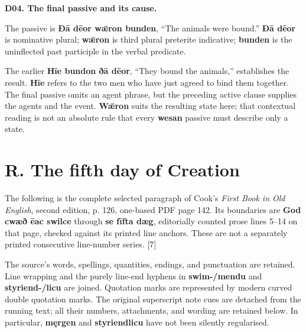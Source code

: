 \par\begin{minipage}{\linewidth}\raggedright
\textbf{D04. The final passive and its cause.}

The passive is \textbf{Ðā dēor wǣron bunden}, “The animals were bound.” \textbf{Ðā dēor} is nominative plural; \textbf{wǣron} is third plural preterite indicative; \textbf{bunden} is the uninflected past participle in the verbal predicate.

The earlier \textbf{Hīe bundon ðā dēor}, “They bound the animals,” establishes the result. \textbf{Hīe} refers to the two men who have just agreed to bind them together. The final passive omits an agent phrase, but the preceding active clause supplies the agents and the event. \textbf{Wǣron} suits the resulting state here; that contextual reading is not an absolute rule that every \textbf{wesan} passive must describe only a state.

\end{minipage}\par\addvspace{4pt}

\section*{R. The fifth day of Creation}

The following is the complete selected paragraph of Cook’s \emph{First Book in Old English}, second edition, p. 126, one-based PDF page 142. Its boundaries are \textbf{God cwæð ēac swilce} through \textbf{se fīfta dæg}, editorially counted prose lines 5–14 on that page, checked against its printed line anchors. These are not a separately printed consecutive line-number series. [7]

The source’s words, spellings, quantities, endings, and punctuation are retained. Line wrapping and the purely line-end hyphens in \textbf{swim-/\allowbreak{}mendu} and \textbf{styriend-/\allowbreak{}licu} are joined. Quotation marks are represented by modern curved double quotation marks. The original superscript note cues are detached from the running text; all their numbers, attachments, and wording are retained below. In particular, \textbf{męrgen} and \textbf{styriendlicu} have not been silently regularised.

